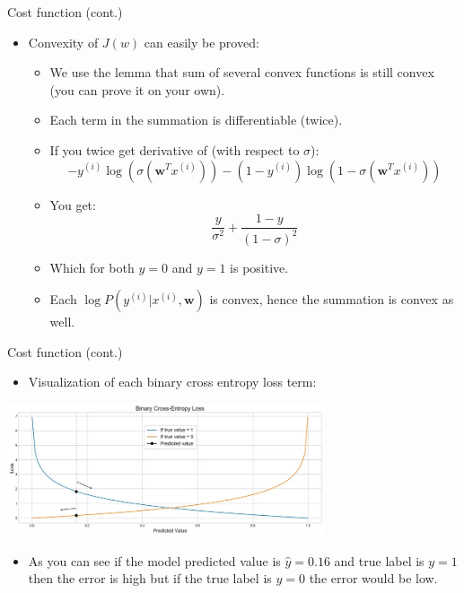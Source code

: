 \documentclass[serif, aspectratio=169]{beamer}
\begin{document}
\begin{frame}{Cost function (cont.)}
    \begin{itemize}
    \item Convexity of $J(w)$ can easily be proved:
        \begin{itemize}
            \item We use the lemma that sum of several convex functions is still convex (you can prove it on your own).
            \item Each term in the summation is differentiable (twice).
            \item If you twice get derivative of (with respect to $\sigma$):
                \[
                    -y^{(i)}\log (\sigma (\mathbf{w}^T x^{(i)})) - 
            (1-y^{(i)})\log (1 - \sigma (\mathbf{w}^T x^{(i)}))
                \]
            \item You get:
                \[
                    \frac{y}{\sigma ^2} + \frac{1-y}{(1-\sigma )^2}
                \]
            \item Which for both $y=0$ and $y=1$ is positive.
            \item Each $\log P(y^{(i)}|x^{(i)}, \mathbf{w})$ is convex, hence the summation is convex as well.
        \end{itemize}
    \end{itemize}
\end{frame}
\begin{frame}{Cost function (cont.)}
    \begin{itemize}
    \item Visualization of each binary cross entropy loss term:
    \end{itemize}
    \begin{center}
        \includegraphics[width=0.7\textwidth]{pic/BCE2.png}
    \end{center}
    
    
    \begin{itemize}
        \item As you can see if the model predicted value is $\hat{y}=0.16$ and true label is $y=1$ then the error is high but if the true label is $y=0$ the error would be low.
    \end{itemize}
    \vfill
\end{frame}
\end{document}
